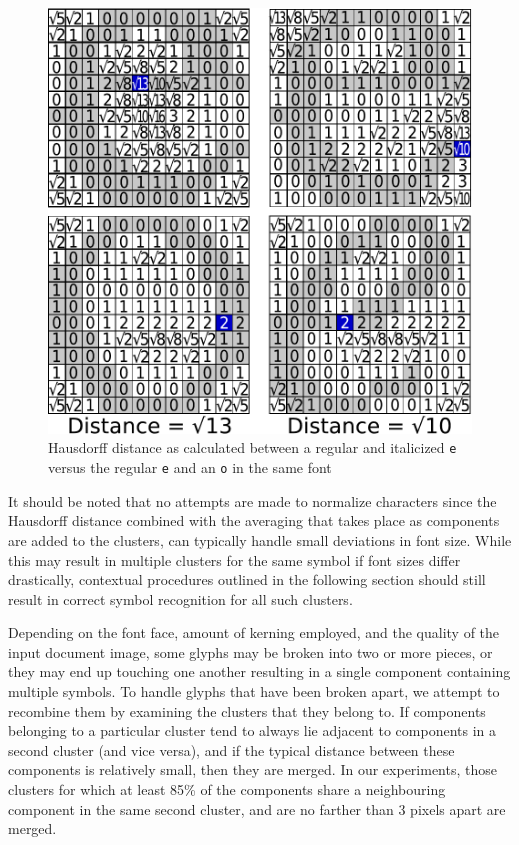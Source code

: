 \documentclass[times, 10pt,twocolumn]{article}
\begin{document}
\begin{figure}[ht]
  \centering
  \includegraphics[scale=.4]{figures/haus_dist_comparisons}
  \caption{Hausdorff distance as calculated between a regular and italicized
  {\tt e} versus the regular {\tt e} and an {\tt o} in the same font}
  \label{hausdist_fig}
\end{figure}

It should be noted that no attempts are made to normalize characters since the
Hausdorff distance combined with the averaging that takes place as components
are added to the clusters, can typically handle small deviations in font size.
While this may result in multiple clusters for the same symbol if font sizes
differ drastically, contextual procedures outlined in the following section
should still result in correct symbol recognition for all such clusters.

Depending on the font face, amount of kerning employed, and the quality of the
input document image, some glyphs may be broken into two or more pieces, or
they may end up touching one another resulting in a single component containing
multiple symbols.
%
To handle glyphs that have been broken apart, we attempt to recombine them by
examining the clusters that they belong to.  If components belonging to a
particular cluster tend to always lie adjacent to components in a second
cluster (and vice versa), and if the typical distance between these components
is relatively small, then they are merged.  In our experiments, those clusters
for which at least 85\% of the components share a neighbouring component in the
same second cluster, and are no farther than 3 pixels apart are merged.
\end{document}
